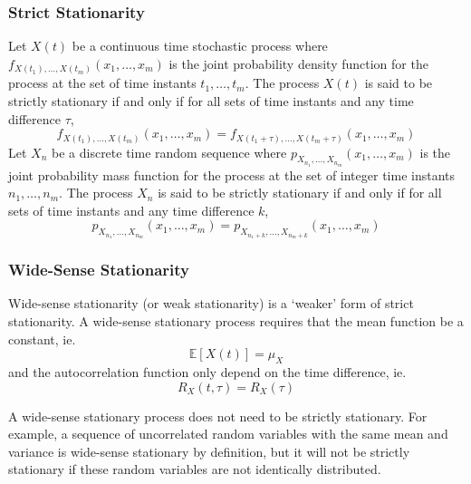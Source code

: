\documentclass[11pt]{report} %
\begin{document}
\subsubsection{Strict Stationarity}

Let $X\left(t\right)$ be a continuous time stochastic process where $f_{X\left(t_{1}\right), \dots, X\left(t_{m}\right)}\left(x_{1}, \dots, x_{m}\right)$ is the joint probability density function for the process at the set of time instants $t_{1}, \dots, t_{m}$. The process $X\left(t\right)$ is said to be strictly stationary if and only if for all sets of time instants and any time difference $\tau$,
\begin{equation}
f_{X\left(t_{1}\right), \dots, X\left(t_{m}\right)}\left(x_{1}, \dots, x_{m}\right) = f_{X\left(t_{1} + \tau\right), \dots, X\left(t_{m} + \tau\right)}\left(x_{1}, \dots, x_{m}\right)
\end{equation}
Let $X_{n}$ be a discrete time random sequence where $p_{X_{n_{1}}, \dots, X_{n_{m}}}\left(x_{1}, \dots, x_{m}\right)$ is the joint probability mass function for the process at the set of integer time instants $n_{1}, \dots, n_{m}$. The process $X_{n}$ is said to be strictly stationary if and only if for all sets of time instants and any time difference $k$,
\begin{equation}
p_{X_{n_{1}}, \dots, X_{n_{m}}}\left(x_{1}, \dots, x_{m}\right) = p_{X_{n_{1} + k}, \dots, X_{n_{m} + k}}\left(x_{1}, \dots, x_{m}\right)
\end{equation}

\subsubsection{Wide-Sense Stationarity}

Wide-sense stationarity (or weak stationarity) is a `weaker' form of strict stationarity. A wide-sense stationary process requires that the mean function be a constant, ie.
\begin{equation}
\mathbb{E}\left[X\left(t\right)\right] = \mu_{X}
\end{equation}
and the autocorrelation function only depend on the time difference, ie.
\begin{equation}
R_{X}\left(t, \tau\right) = R_{X}\left(\tau\right)
\end{equation}

A wide-sense stationary process does not need to be strictly stationary. For example, a sequence of uncorrelated random variables with the same mean and variance is wide-sense stationary by definition, but it will not be strictly stationary if these random variables are not identically distributed. \\
\end{document}
